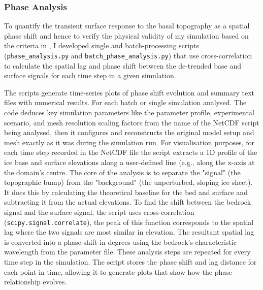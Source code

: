 
\subsubsection{Phase Analysis}
To quantify the transient surface response to the basal topography as a spatial phase shift and hence to verify the physical validity of my simulation based on the criteria in \cite{Budd_1970}, I developed single and batch-processing scripts (\texttt{phase\_analysis.py} and \texttt{batch\_phase\_analysis.py}) that use cross-correlation to calculate the spatial lag and phase shift between the de-trended base and surface signals for each time step in a given simulation.

 The scripts generate time-series plots of phase shift evolution and summary text files with numerical results. For each batch or single simulation analysed.
The code deduces key simulation parameters like the parameter profile, experimental scenario, and mesh resolution scaling factors from the name of the NetCDF script being analysed, then it configures and reconstructs the original model setup and mesh exactly as it was during the simulation run.
For visualisation purposes, for each time step recorded in the NetCDF file the script extracts a 1D profile of the ice base and surface elevations along a user-defined line (e.g., along the x-axis at the domain's centre. The core of the analysis is to separate the "signal" (the topographic bump) from the "background" (the unperturbed, sloping ice sheet). It does this by calculating the theoretical baseline for the bed and surface and subtracting it from the actual elevations. To find the shift between the bedrock signal and the surface signal, the script uses cross-correlation (\texttt{scipy.signal.correlate}), the peak of this function corresponds to the spatial lag where the two signals are most similar in elevation.
The resultant spatial lag is converted into a phase shift in degrees using the bedrock's characteristic wavelength from the parameter file. These analysis steps are repeated for every time step in the simulation. The script stores the phase shift and lag distance for each point in time, allowing it to generate plots that show how the phase relationship evolves.

